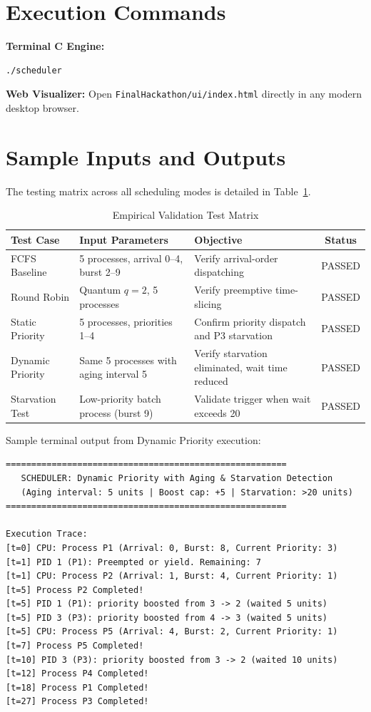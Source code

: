 \documentclass[12pt,a4paper]{report}
\begin{document}
\section{Execution Commands}
\textbf{Terminal C Engine:}
\begin{lstlisting}[language=bash]
./scheduler
\end{lstlisting}

\textbf{Web Visualizer:}
Open \texttt{FinalHackathon/ui/index.html} directly in any modern desktop browser.

\section{Sample Inputs and Outputs}
The testing matrix across all scheduling modes is detailed in Table~\ref{tab:test_matrix}.

\begin{table}[H]
\centering
\caption{Empirical Validation Test Matrix}
\label{tab:test_matrix}
\small
\begin{tabularx}{\textwidth}{|p{2.8cm}|X|X|c|}
\hline
\rowcolor{codebg}
\textbf{Test Case} & \textbf{Input Parameters} & \textbf{Objective} & \textbf{Status} \\
\hline
FCFS Baseline & 5 processes, arrival 0--4, burst 2--9 & Verify arrival-order dispatching & PASSED \\
\hline
Round Robin & Quantum $q=2$, 5 processes & Verify preemptive time-slicing & PASSED \\
\hline
Static Priority & 5 processes, priorities 1--4 & Confirm priority dispatch and P3 starvation & PASSED \\
\hline
Dynamic Priority & Same 5 processes with aging interval 5 & Verify starvation eliminated, wait time reduced & PASSED \\
\hline
Starvation Test & Low-priority batch process (burst 9) & Validate trigger when wait exceeds 20 & PASSED \\
\hline
\end{tabularx}
\end{table}

Sample terminal output from Dynamic Priority execution:
\begin{lstlisting}
=======================================================
   SCHEDULER: Dynamic Priority with Aging & Starvation Detection
   (Aging interval: 5 units | Boost cap: +5 | Starvation: >20 units)
=======================================================

Execution Trace:
[t=0] CPU: Process P1 (Arrival: 0, Burst: 8, Current Priority: 3)
[t=1] PID 1 (P1): Preempted or yield. Remaining: 7
[t=1] CPU: Process P2 (Arrival: 1, Burst: 4, Current Priority: 1)
[t=5] Process P2 Completed!
[t=5] PID 1 (P1): priority boosted from 3 -> 2 (waited 5 units)
[t=5] PID 3 (P3): priority boosted from 4 -> 3 (waited 5 units)
[t=5] CPU: Process P5 (Arrival: 4, Burst: 2, Current Priority: 1)
[t=7] Process P5 Completed!
[t=10] PID 3 (P3): priority boosted from 3 -> 2 (waited 10 units)
[t=12] Process P4 Completed!
[t=18] Process P1 Completed!
[t=27] Process P3 Completed!
\end{lstlisting}
\end{document}
